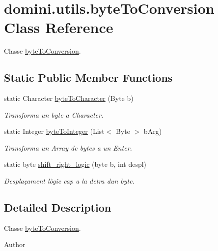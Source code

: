\hypertarget{classdomini_1_1utils_1_1byteToConversion}{}\section{domini.\+utils.\+byte\+To\+Conversion Class Reference}
\label{classdomini_1_1utils_1_1byteToConversion}


Classe \hyperlink{classdomini_1_1utils_1_1byteToConversion}{byte\+To\+Conversion}.  


\subsection*{Static Public Member Functions}
\begin{DoxyCompactItemize}
\item 
static Character \hyperlink{classdomini_1_1utils_1_1byteToConversion_a5d2f5f8de52e4001cf6698ca03fe31e8}{byte\+To\+Character} (Byte b)
\begin{DoxyCompactList}\small\item\em Transforma un byte a Character. \end{DoxyCompactList}\item 
static Integer \hyperlink{classdomini_1_1utils_1_1byteToConversion_a3242a47adade49b6cfa6a9232944f587}{byte\+To\+Integer} (List$<$ Byte $>$ b\+Arg)
\begin{DoxyCompactList}\small\item\em Transforma un Array de bytes a un Enter. \end{DoxyCompactList}\item 
static byte \hyperlink{classdomini_1_1utils_1_1byteToConversion_a0e232cb9d272ccc13accda58bab9f8e1}{shift\+\_\+right\+\_\+logic} (byte b, int despl)
\begin{DoxyCompactList}\small\item\em Desplaçament lògic cap a la detra d\textquotesingle{}un byte. \end{DoxyCompactList}\end{DoxyCompactItemize}


\subsection{Detailed Description}
Classe \hyperlink{classdomini_1_1utils_1_1byteToConversion}{byte\+To\+Conversion}. 

\begin{DoxyAuthor}{Author}

\end{DoxyAuthor}



